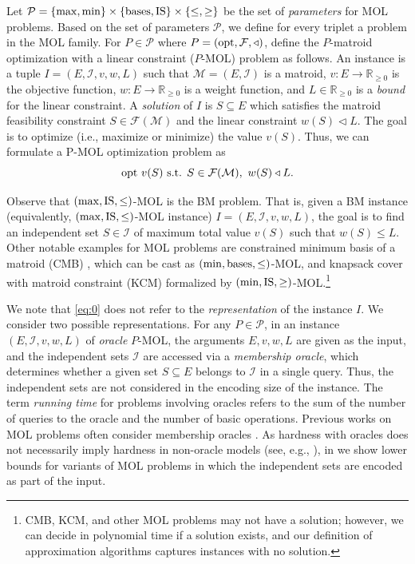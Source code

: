 \documentclass[11pt,letter]{article}
\newcommand{\opt}{\textnormal{opt}}
\newcommand{\bases}{\textnormal{bases}}
\newcommand{\IS}{\textnormal{IS}}
\newcommand{\cI}{{\mathcal{I}}}
\newcommand{\cm}{{\mathcal{M}}}
\newcommand{\cF}{{\mathcal{F}}}
\newcommand{\cP}{{\mathcal{P}}}
\begin{document}
Let $\cP = \{\max,\min\} \times \{\bases,\IS\} \times \{\leq ,\geq\}$ be the set of {\em parameters} for MOL problems. 
Based on the set of parameters $\cP$, we define for every triplet a problem
in the MOL family. For $P \in \cP$ where $P = \left(\opt,\cF,\triangleleft\right)$, define the $P$-{\sc matroid optimization with a linear constraint} ($P$-MOL) problem as follows. An instance is a tuple $I = (E,\cI,v,w,L)$ such that $\cm = (E,\cI)$ is a matroid, $v:E \rightarrow \mathbb{R}_{\geq 0}$ is the objective function, $w:E \rightarrow \mathbb{R}_{\geq 0}$ is a weight function, and $L \in \mathbb{R}_{\geq 0}$ is a {\em bound} for the linear constraint. 
A {\em solution} of $I$ is $S \subseteq E$ which satisfies the matroid feasibility constraint $S \in \cF(\cm)$ and the linear constraint $w(S) \triangleleft L$. The goal is to optimize (i.e., maximize or minimize) the value $v(S)$. Thus, we can formulate a P-MOL optimization problem as
\begin{equation}
\label{eq:0}
\opt~ v(S) \text{ s.t. } S \in \cF(\cm),~  w(S) \triangleleft L.
\end{equation} 



Observe that $(\max,\IS,\leq)$-MOL is the BM problem.
That is, given a BM instance (equivalently, $(\max,\IS,\leq)$-MOL instance) $I = (E,\cI,v,w,L)$, the goal is to find an independent set $S \in \cI$ of maximum total value $v(S)$ such that $w(S) \leq L$. Other notable examples for MOL problems are {\sc constrained minimum basis of a matroid} (CMB) \cite{HL04}, which can be cast as $(\min,\bases,\leq)$-MOL, and {\sc knapsack cover with matroid constraint} (KCM) \cite{CCNR13} formalized by $(\min,\IS,\geq)$-MOL.\footnote{CMB, KCM, and other MOL problems may not have a solution; however, we can decide in polynomial time if a solution exists, and our definition of approximation algorithms captures instances with no solution.}



We note that \eqref{eq:0} does not refer to the {\em representation} of the instance $I$. We consider two possible representations.
For any $P \in \cP$, in an instance $(E,\cI,v,w,L)$ of {\em oracle} $P$-MOL, the arguments
$E,v,w,L$ are given as the input, and the independent sets $\cI$ are accessed via a {\em membership oracle}, which determines whether a given set $S \subseteq E$ belongs to  $\cI$ in a single query. Thus, the independent sets are not considered in the encoding size of the instance. The term {\em running time} for problems involving oracles refers to the sum of the number of queries to the oracle and the number of basic operations. 
Previous works on MOL problems often consider membership oracles \cite{CVZ11,BBGS11,CCNR13,DKS23,DKS23b}. As hardness with oracles does not necessarily imply hardness in non-oracle models (see, e.g., \cite{canetti2004random,chang1994random}), in  we show lower bounds for variants of MOL problems in which the independent sets are encoded as part of the input.   
\end{document}
